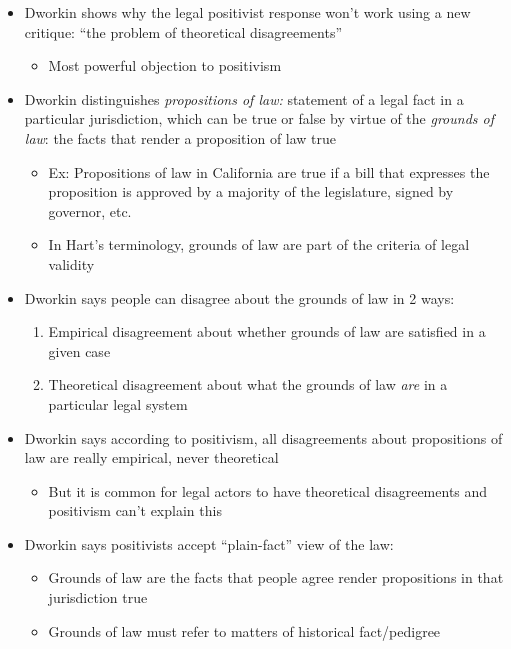 \begin{itemize}
\tightlist
\item
  Dworkin shows why the legal positivist response won't work using a new
  critique: ``the problem of theoretical disagreements''

  \begin{itemize}
  \tightlist
  \item
    Most powerful objection to positivism
  \end{itemize}
\item
  Dworkin distinguishes \emph{propositions of law:} statement of a legal
  fact in a particular jurisdiction, which can be true or false by
  virtue of the \emph{grounds of law}: the facts that render a
  proposition of law true

  \begin{itemize}
  \tightlist
  \item
    Ex: Propositions of law in California are true if a bill that
    expresses the proposition is approved by a majority of the
    legislature, signed by governor, etc.
  \item
    In Hart's terminology, grounds of law are part of the criteria of
    legal validity
  \end{itemize}
\item
  Dworkin says people can disagree about the grounds of law in 2 ways:

  \begin{enumerate}
  \def\labelenumi{\arabic{enumi}.}
  \tightlist
  \item
    Empirical disagreement about whether grounds of law are satisfied in
    a given case
  \item
    Theoretical disagreement about what the grounds of law \emph{are} in
    a particular legal system
  \end{enumerate}
\item
  Dworkin says according to positivism, all disagreements about
  propositions of law are really empirical, never theoretical

  \begin{itemize}
  \tightlist
  \item
    But it is common for legal actors to have theoretical disagreements
    and positivism can't explain this
  \end{itemize}
\item
  Dworkin says positivists accept ``plain-fact'' view of the law:

  \begin{itemize}
  \tightlist
  \item
    Grounds of law are the facts that people agree render propositions
    in that jurisdiction true
  \item
    Grounds of law must refer to matters of historical fact/pedigree


\end{itemize}
\end{itemize}
